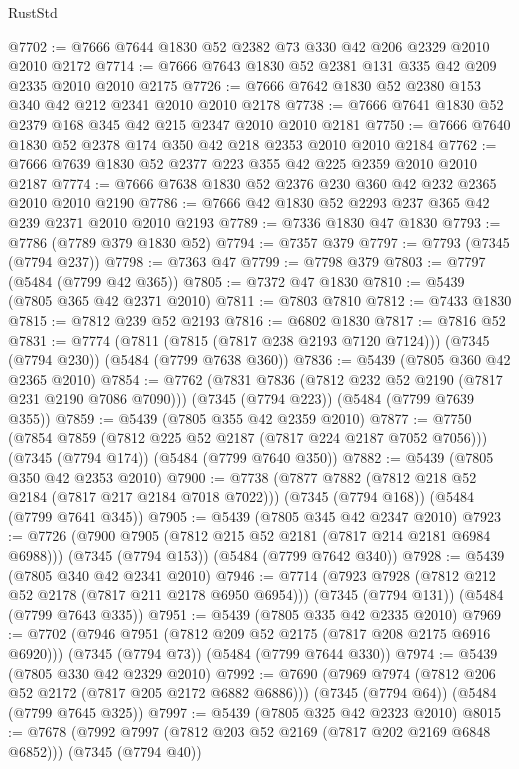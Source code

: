 \begin{lexlean}{RustStd}
\begin{coremodule}
{\begin{coremodule}
{{{{{{{{{{{{{{{{{{{{{{{{{{{{{{{@7702 := @7666 @7644 @1830 @52 @2382 @73 @330 @42 @206 @2329 @2010 @2010 @2172
@7714 := @7666 @7643 @1830 @52 @2381 @131 @335 @42 @209 @2335 @2010 @2010 @2175
@7726 := @7666 @7642 @1830 @52 @2380 @153 @340 @42 @212 @2341 @2010 @2010 @2178
@7738 := @7666 @7641 @1830 @52 @2379 @168 @345 @42 @215 @2347 @2010 @2010 @2181
@7750 := @7666 @7640 @1830 @52 @2378 @174 @350 @42 @218 @2353 @2010 @2010 @2184
@7762 := @7666 @7639 @1830 @52 @2377 @223 @355 @42 @225 @2359 @2010 @2010 @2187
@7774 := @7666 @7638 @1830 @52 @2376 @230 @360 @42 @232 @2365 @2010 @2010 @2190
@7786 := @7666 @42 @1830 @52 @2293 @237 @365 @42 @239 @2371 @2010 @2010 @2193
@7789 := @7336 @1830 @47 @1830
@7793 := @7786 (@7789 @379 @1830 @52)
@7794 := @7357 @379
@7797 := @7793 (@7345 (@7794 @237))
@7798 := @7363 @47
@7799 := @7798 @379
@7803 := @7797 (@5484 (@7799 @42 @365))
@7805 := @7372 @47 @1830
@7810 := @5439 (@7805 @365 @42 @2371 @2010)
@7811 := @7803 @7810
@7812 := @7433 @1830
@7815 := @7812 @239 @52 @2193
@7816 := @6802 @1830
@7817 := @7816 @52
@7831 := @7774
    (@7811 (@7815 (@7817 @238 @2193 @7120 @7124)))
    (@7345 (@7794 @230))
    (@5484 (@7799 @7638 @360))
@7836 := @5439 (@7805 @360 @42 @2365 @2010)
@7854 := @7762
    (@7831 @7836 (@7812 @232 @52 @2190 (@7817 @231 @2190 @7086 @7090)))
    (@7345 (@7794 @223))
    (@5484 (@7799 @7639 @355))
@7859 := @5439 (@7805 @355 @42 @2359 @2010)
@7877 := @7750
    (@7854 @7859 (@7812 @225 @52 @2187 (@7817 @224 @2187 @7052 @7056)))
    (@7345 (@7794 @174))
    (@5484 (@7799 @7640 @350))
@7882 := @5439 (@7805 @350 @42 @2353 @2010)
@7900 := @7738
    (@7877 @7882 (@7812 @218 @52 @2184 (@7817 @217 @2184 @7018 @7022)))
    (@7345 (@7794 @168))
    (@5484 (@7799 @7641 @345))
@7905 := @5439 (@7805 @345 @42 @2347 @2010)
@7923 := @7726
    (@7900 @7905 (@7812 @215 @52 @2181 (@7817 @214 @2181 @6984 @6988)))
    (@7345 (@7794 @153))
    (@5484 (@7799 @7642 @340))
@7928 := @5439 (@7805 @340 @42 @2341 @2010)
@7946 := @7714
    (@7923 @7928 (@7812 @212 @52 @2178 (@7817 @211 @2178 @6950 @6954)))
    (@7345 (@7794 @131))
    (@5484 (@7799 @7643 @335))
@7951 := @5439 (@7805 @335 @42 @2335 @2010)
@7969 := @7702
    (@7946 @7951 (@7812 @209 @52 @2175 (@7817 @208 @2175 @6916 @6920)))
    (@7345 (@7794 @73))
    (@5484 (@7799 @7644 @330))
@7974 := @5439 (@7805 @330 @42 @2329 @2010)
@7992 := @7690
    (@7969 @7974 (@7812 @206 @52 @2172 (@7817 @205 @2172 @6882 @6886)))
    (@7345 (@7794 @64))
    (@5484 (@7799 @7645 @325))
@7997 := @5439 (@7805 @325 @42 @2323 @2010)
@8015 := @7678
    (@7992 @7997 (@7812 @203 @52 @2169 (@7817 @202 @2169 @6848 @6852)))
    (@7345 (@7794 @40))
}}}}}}}}}}}}}}}}}}}}}}}}}}}}}}}
\end{coremodule}}
\end{coremodule}
\end{lexlean}
